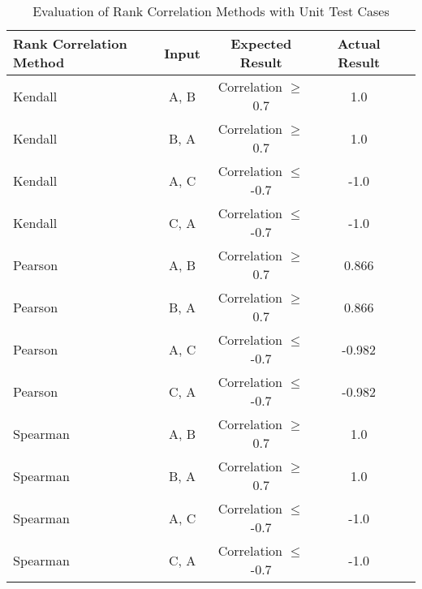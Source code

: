 \begin{table}[h!]
    \caption{Evaluation of Rank Correlation Methods with Unit Test Cases}
    \label{tab:rank_correlation_results}
    \centering
    \begin{tabular}{|l|c|c|c|c|}
        \hline
        \textbf{Rank Correlation Method} & \textbf{Input} & \textbf{Expected Result}       & \textbf{Actual Result} \\ \hline
        Kendall                          & A, B           & Correlation $\geq$ 0.7       & 1.0          \\ \hline
        Kendall                          & B, A           & Correlation $\geq$ 0.7       & 1.0          \\ \hline
        Kendall                          & A, C           & Correlation $\leq$ -0.7      & -1.0         \\ \hline
        Kendall                          & C, A           & Correlation $\leq$ -0.7      & -1.0         \\ \hline
        Pearson                          & A, B           & Correlation $\geq$ 0.7       & 0.866        \\ \hline
        Pearson                          & B, A           & Correlation $\geq$ 0.7       & 0.866        \\ \hline
        Pearson                          & A, C           & Correlation $\leq$ -0.7      & -0.982       \\ \hline
        Pearson                          & C, A           & Correlation $\leq$ -0.7      & -0.982       \\ \hline
        Spearman                         & A, B           & Correlation $\geq$ 0.7       & 1.0          \\ \hline
        Spearman                         & B, A           & Correlation $\geq$ 0.7       & 1.0          \\ \hline
        Spearman                         & A, C           & Correlation $\leq$ -0.7      & -1.0         \\ \hline
        Spearman                         & C, A           & Correlation $\leq$ -0.7      & -1.0         \\ \hline
    \end{tabular}
\end{table}